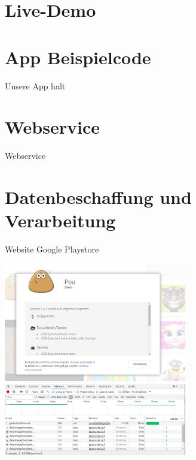 \documentclass[compress,t]{beamer}
\begin{document}
\section{Live-Demo}

\section{App Beispielcode}

\begin{frame}
    Unsere App halt
\end{frame}

\section{Webservice}

\begin{frame}
    Webservice
\end{frame}

\section{Datenbeschaffung und Verarbeitung}

\begin{frame}{Website Google Playstore}

    \begin{center}
        \includegraphics[width=0.6\textwidth]{img/google_play.png}
        \newline
        \includegraphics[width=0.6\textwidth]{img/google_play_network.png}
    \end{center}

\end{frame}
\end{document}

